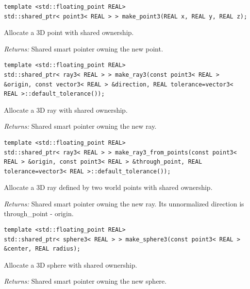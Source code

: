 \par\noindent\begin{minipage}{\linewidth}
\begin{lstlisting}[style=apireference]
template <std::floating_point REAL>
std::shared_ptr< point3< REAL > > make_point3(REAL x, REAL y, REAL z);
\end{lstlisting}
{\footnotesize Allocate a 3D point with shared ownership.\par}
{\footnotesize\textit{Returns:} Shared smart pointer owning the new point.\par}
\end{minipage}\par\vspace{1pt}
\par\noindent\begin{minipage}{\linewidth}
\begin{lstlisting}[style=apireference]
template <std::floating_point REAL>
std::shared_ptr< ray3< REAL > > make_ray3(const point3< REAL > &origin, const vector3< REAL > &direction, REAL tolerance=vector3< REAL >::default_tolerance());
\end{lstlisting}
{\footnotesize Allocate a 3D ray with shared ownership.\par}
{\footnotesize\textit{Returns:} Shared smart pointer owning the new ray.\par}
\end{minipage}\par\vspace{1pt}
\par\noindent\begin{minipage}{\linewidth}
\begin{lstlisting}[style=apireference]
template <std::floating_point REAL>
std::shared_ptr< ray3< REAL > > make_ray3_from_points(const point3< REAL > &origin, const point3< REAL > &through_point, REAL tolerance=vector3< REAL >::default_tolerance());
\end{lstlisting}
{\footnotesize Allocate a 3D ray defined by two world points with shared ownership.\par}
{\footnotesize\textit{Returns:} Shared smart pointer owning the new ray. Its unnormalized direction is through\_point - origin.\par}
\end{minipage}\par\vspace{1pt}
\par\noindent\begin{minipage}{\linewidth}
\begin{lstlisting}[style=apireference]
template <std::floating_point REAL>
std::shared_ptr< sphere3< REAL > > make_sphere3(const point3< REAL > &center, REAL radius);
\end{lstlisting}
{\footnotesize Allocate a 3D sphere with shared ownership.\par}
{\footnotesize\textit{Returns:} Shared smart pointer owning the new sphere.\par}
\end{minipage}\par\vspace{1pt}

